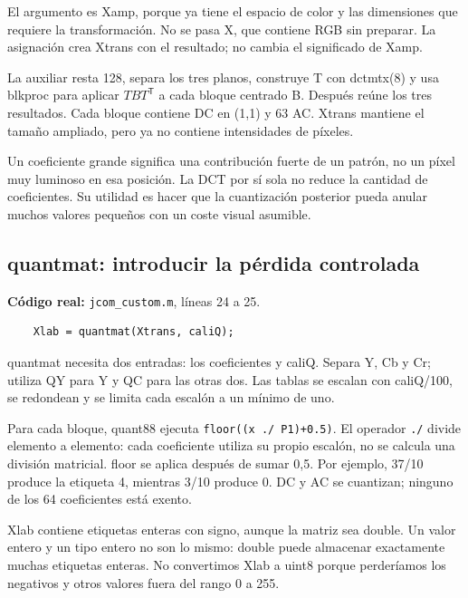\documentclass[11pt,a4paper,oneside]{report}
\begin{document}
El argumento es Xamp, porque ya tiene el espacio de color y las dimensiones
que requiere la transformación. No se pasa X, que contiene RGB sin preparar.
La asignación crea Xtrans con el resultado; no cambia el significado de Xamp.

La auxiliar resta 128, separa los tres planos, construye T con dctmtx(8)
y usa blkproc para aplicar $TBT^{\mathsf T}$ a cada bloque centrado B.
Después reúne los tres resultados. Cada bloque contiene DC en (1,1) y 63 AC.
Xtrans mantiene el tamaño ampliado, pero ya no contiene intensidades de píxeles.

Un coeficiente grande significa una contribución fuerte de un patrón, no un
píxel muy luminoso en esa posición. La DCT por sí sola no reduce la cantidad
de coeficientes. Su utilidad es hacer que la cuantización posterior pueda
anular muchos valores pequeños con un coste visual asumible.


\par\medskip\noindent\begin{minipage}{\linewidth}

\subsection{quantmat: introducir la pérdida controlada}

\textbf{Código real:} \texttt{jcom\_custom.m}, líneas 24 a 25.

\begin{lstlisting}[firstnumber=24]
    % PASO 4: cuantizar los coeficientes DCT.
    Xlab = quantmat(Xtrans, caliQ);
\end{lstlisting}

\end{minipage}\par


quantmat necesita dos entradas: los coeficientes y caliQ. Separa Y, Cb y Cr;
utiliza QY para Y y QC para las otras dos. Las tablas se escalan con caliQ/100,
se redondean y se limita cada escalón a un mínimo de uno.

Para cada bloque, quant88 ejecuta \texttt{floor((x ./ P1)+0.5)}. El operador
\texttt{./} divide elemento a elemento: cada coeficiente utiliza su propio
escalón, no se calcula una división matricial. floor se aplica después de
sumar 0,5. Por ejemplo, 37/10 produce la etiqueta 4, mientras 3/10 produce 0.
DC y AC se cuantizan; ninguno de los 64 coeficientes está exento.

Xlab contiene etiquetas enteras con signo, aunque la matriz sea double.
Un valor entero y un tipo entero no son lo mismo: double puede almacenar
exactamente muchas etiquetas enteras. No convertimos Xlab a uint8 porque
perderíamos los negativos y otros valores fuera del rango 0 a 255.
\end{document}

